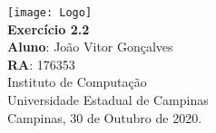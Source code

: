 \documentclass[12pt,a4paper]{report}
\begin{document}
\begin{titlepage}
        \begin{center}
                \vspace*{1cm}
                \texttt{[image: Logo]}\\
                \vspace{1.5cm}
                \Huge
                \textbf{Exercício 2.2}\\
                \vspace{1.5cm}
                \Large
                \textbf{Aluno}: João Vitor Gonçalves\\
                \textbf{RA}: 176353\\
                \vspace{1.2cm}
                \Large
                Instituto de Computação\\
                Universidade Estadual de Campinas\\
                \vspace{1.5cm}
                Campinas, 30 de Outubro de 2020.
        \end{center}
\end{titlepage}
\tableofcontents
\clearpage

\newcommand{\shellcmd}[1]{\texttt{\footnotesize\# #1}}%



\end{document}

